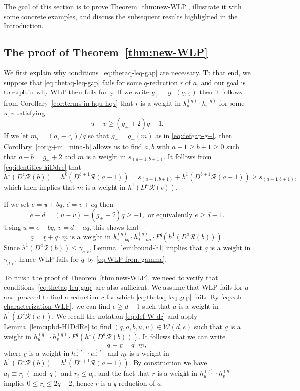 \documentclass[11pt,reqno]{amsart}
\newcommand{\mc}[1]{\mathcal{#1}}
\newcommand{\op}[1]{\operatorname{#1}}
\newcommand{\ul}[1]{\underline{#1}}
\theoremstyle{definition}
\theoremstyle{remark}
\numberwithin{equation}{section}
\begin{document}
The goal of this section is to prove Theorem~\ref{thm:new-WLP}, illustrate it with some concrete examples, and discuss the subsequent results highlighted in the Introduction.

\subsection{The proof of Theorem~\ref{thm:new-WLP}}
\label{subsec:proof-new-WLP}

We first explain why conditions~\eqref{eq:thetaq-leq-gap} are necessary. To that end, we suppose that \eqref{eq:thetaq-leq-gap} fails for some $q$-reduction $\ul{r}$ of $\ul{a}$, and our goal is to explain why WLP then fails for $\ul{a}$. If we write $g_+=g_+(\ul{a};\ul{r})$ then it follows from Corollary~\ref{cor:terms-in-hqu-hqv} that $\ul{r}$ is a weight in $h^{(q)}_u\cdot h^{(q)}_v$ for some $u,v$ satisfying
\[ u-v \geq (g_++2)q-1.\]
If we let $m_i = (a_i-r_i)/q$ so that $g_+=g_+(\ul{m})$ as in \eqref{eq:defgap-g+}, then Corollary~\ref{cor:g+m=mina-b} allows us to find $a,b$ with $a-1\geq b+1\geq 0$ such that $a-b=g_++2$ and $\ul{m}$ is a weight in $s_{(a-1,b+1)}$. It follows from \eqref{eq:identities-hiDdre} that
\[h^1(D^a\mc{R}(b)) = h^0(D^{b+1}\mc{R}(a-1)) = s_{(a-1,b+1)} + h^1(D^{b+1}\mc{R}(a-1)) \geq s_{(a-1,b+1)},\]
which then implies that $\ul{m}$ is a weight in $h^1(D^a\mc{R}(b))$.  

If we set $e = u+bq$, $d = v+aq$ then
\[e-d = (u-v) - (g_++2)q \geq -1,\text{ or equivalently }e\geq d-1.\]
Using $u=e-bq$, $v=d-aq$, this shows that
\[\ul{a} = \ul{r}+q\cdot\ul{m}\text{ is a weight in }h^{(q)}_{e-bq}\cdot h^{(q)}_{d-aq}\cdot F^q\left(h^1(D^a\mc{R}(b))\right).\]
Since $h^1(D^a\mc{R}(b))\leq \gamma_{a,b}$, Lemma~\ref{lem:bound-h1} implies that $\ul{a}$ is a weight in $\gamma_{d,e}$, hence WLP fails for $\ul{a}$ by \eqref{eq:WLP-from-gamma}.

To finish the proof of Theorem~\ref{thm:new-WLP}, we need to verify that conditions~\eqref{eq:thetaq-leq-gap} are also sufficient. We assume that WLP fails for $\ul{a}$ and proceed to find a reduction $\ul{r}$ for which \eqref{eq:thetaq-leq-gap} fails. By \eqref{eq:coh-characterization-WLP}, we can find $e\geq d-1$ such that $\ul{a}$ is a weight in $h^1(D^d\mc{R}(e))$. We recall the notation \eqref{eq:def-W-de} and apply Lemma~\ref{lem:upbd-H1DdRe} to find $(q,a,b,u,v)\in\mc{W}(d,e)$ such that $\ul{a}$ is a weight in $h^{(q)}_u\cdot h^{(q)}_v \cdot F^q\left(h^1(D^a\mc{R}(b))\right)$. It follows that we can write
 \[\ul{a} = \ul{r} + q\cdot\ul{m},\]
 where $\ul{r}$ is a weight in $h^{(q)}_u\cdot h^{(q)}_v$ and $\ul{m}$ is a weight in $h^1(D^a\mc{R}(b))=h^0(D^{b+1}\mc{R}(a-1))$. By construction we have $a_i\equiv r_i\ (\op{mod}\ q)$ and $r_i\leq a_i$, and the fact that $\ul{r}$ is a weight in $h^{(q)}_u\cdot h^{(q)}_v$ implies $0\leq r_i\leq 2q-2$, hence $\ul{r}$ is a $q$-reduction of $\ul{a}$.
 
\end{document}
